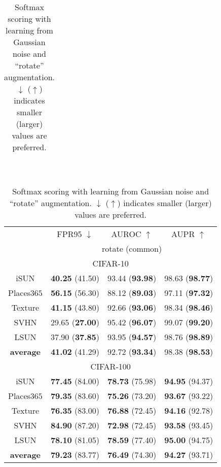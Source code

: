 \documentclass{article}
\begin{document}
\begin{table}[t]
{{\begin{tabular}{c|ccc}
\end{tabular}
}}~~~~
\parbox{.47\linewidth}{
\centering
\caption{{Softmax scoring with learning from Gaussian noise and ``rotate'' augmentation. $\downarrow$ ($\uparrow$) indicates smaller (larger) values are preferred.}} \label{tab: softmax rotate}
\vspace{5pt}
\scriptsize{
\begin{tabular}{c|ccc}
\toprule[1.5pt]
                   & FPR95 $\downarrow$     & AUROC $\uparrow$       & AUPR $\uparrow$      \\
                   \cline{2-4} 
\multirow{-2}{*}{} & \multicolumn{3}{c}{rotate (common)} \\
\midrule[0.6pt]
\multicolumn{4}{c}{\cellcolor{greyL}CIFAR-10} \\
\midrule[0.6pt]
iSUN               & \textbf{40.25} (41.50) & 93.44 (\textbf{93.98}) & 98.63 (\textbf{98.77}) \\ 
Places$365$        & \textbf{56.15} (56.30) & 88.12 (\textbf{89.03}) & 97.11 (\textbf{97.32}) \\
Texture            & \textbf{41.15} (43.80) & 92.66 (\textbf{93.06}) & 98.34 (\textbf{98.46}) \\
SVHN               & 29.65 (\textbf{27.00}) & 95.42 (\textbf{96.07}) & {99.07} (\textbf{99.20}) \\
LSUN               & 37.90 (\textbf{37.85}) & 93.95 (\textbf{94.57}) & 98.76 (\textbf{98.89}) \\
\midrule
\textbf{average}   & \textbf{41.02} (41.29) & {92.72} (\textbf{93.34}) & {98.38} (\textbf{98.53}) \\ \midrule[1pt]
\multicolumn{4}{c}{\cellcolor{greyL}CIFAR-100} \\
\midrule[1pt]
iSUN               & \textbf{77.45} (84.00) & \textbf{78.73} (75.98) & \textbf{94.95} (94.37) \\ 
Places$365$        & \textbf{79.35} (83.60) & \textbf{75.26} (73.20) & \textbf{93.67} (93.22) \\
Texture            & \textbf{76.35} (83.00) & \textbf{76.88} (72.45) & \textbf{94.16} (92.78) \\
SVHN               & \textbf{84.90} (87.20) & \textbf{72.98} (72.45) & \textbf{93.58} (93.45) \\
LSUN               & \textbf{78.10} (81.05) & \textbf{78.59} (77.40) & \textbf{95.00} (94.75) \\
\midrule
\textbf{average}   & \textbf{79.23} (83.77) & \textbf{76.49} (74.30) & \textbf{94.27} (93.71) \\ \bottomrule[1.5pt]      
\end{tabular}
}}
\end{table}
\end{document}
